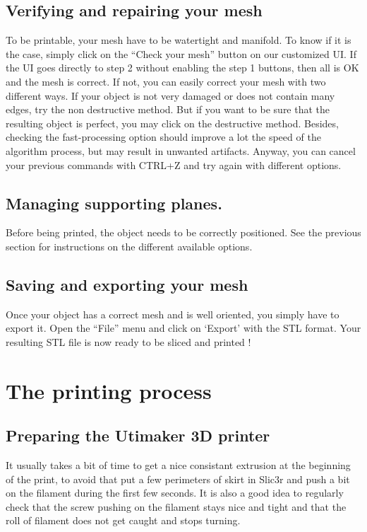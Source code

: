 \documentclass{article}
\begin{document}
\subsection{Verifying and repairing your mesh}

To be printable, your mesh have to be watertight and manifold. To know if it is the case, simply click on the ``Check your mesh'' button on our customized UI. If the UI goes directly to step 2 without enabling the step 1 buttons, then all is OK and the mesh is correct. If not, you can easily correct your mesh with two different ways. If your object is not very damaged or does not contain many edges, try the non destructive method. But if you want to be sure that the resulting object is perfect, you may click on the destructive method. Besides, checking the fast-processing option should improve a lot the speed of the algorithm process, but may result in unwanted artifacts. Anyway, you can cancel your previous commands with CTRL+Z and try again with different options.

\subsection{Managing supporting planes.}
Before being printed, the object needs to be correctly positioned. See the previous section for instructions on the different available options.

\subsection{Saving and exporting your mesh}

Once your object has a correct mesh and is well oriented, you simply have to export it. Open the ``File'' menu and click on `Export' with the STL format. Your resulting STL file is now ready to be sliced and printed !

\newpage

\section{The printing process}

\subsection{Preparing the Utimaker 3D printer}

It usually takes a bit of time to get a nice consistant extrusion at the beginning of the print, to avoid that put a few perimeters of skirt in Slic3r and push a bit on the filament during the first few seconds.
It is also a good idea to regularly check that the screw pushing on the filament stays nice and tight and that the roll of filament does not get caught and stops turning.
\end{document}
